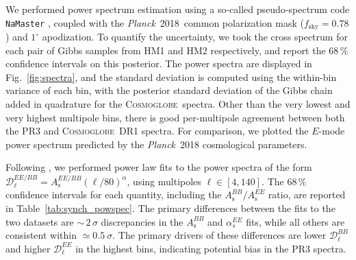 \documentclass[twocolumn]{../../common/aa}
\def\Planck{\emph{Planck}}
\newcommand{\cosmoglobe}{\textsc{Cosmoglobe}}
\begin{document}

We performed power spectrum estimation using a so-called pseudo-spectrum code \texttt{NaMaster} \citep{namaster}, coupled with the \Planck\ 2018\ common polarization mask ($f_\mathrm{sky}=0.78$) and $1^\circ$ apodization.
To quantify the uncertainty, we took the cross spectrum for each pair of Gibbs samples from HM1 and HM2 respectively, and report the 68\,\% confidence intervals on this posterior. The power spectra are displayed in Fig.~\ref{fig:spectra}, and the standard deviation is computed using the within-bin variance of each bin, with the posterior standard deviation of the Gibbs chain added in quadrature for the \cosmoglobe\ spectra.
Other than the very lowest and very highest multipole bins, there is good per-multipole agreement between both the PR3 and \cosmoglobe\ DR1 spectra. For comparison, we plotted the $E$-mode power spectrum predicted by the \Planck\ 2018 cosmological parameters.

Following \citet{planck2016-l04}, we performed power law fits to the power spectra of the form ${\mathcal D_\ell^{EE/BB}=A_{\mathrm{s}}^{{EE/BB}}(\ell/80)^\alpha}$, using multipoles $\ell\in[4,140]$. The 68\,\% confidence intervals for each quantity, including the $A_{\mathrm{s}}^{BB}/A_{\mathrm{s}}^{EE}$ ratio, are reported in Table~\ref{tab:synch_powspec}. The primary differences between the fits to the two datasets are $\sim$\,$2\,\sigma$ discrepancies in the $A_{\mathrm{s}}^{BB}$ and $\alpha_s^{EE}$ fits, while all others are consistent within $\simeq0.5~\sigma$. The primary drivers of these differences are lower $\mathcal D_\ell^{BB}$ and higher $\mathcal D_\ell^{EE}$ in the highest bins, indicating potential bias in the PR3 spectra.
\end{document}
